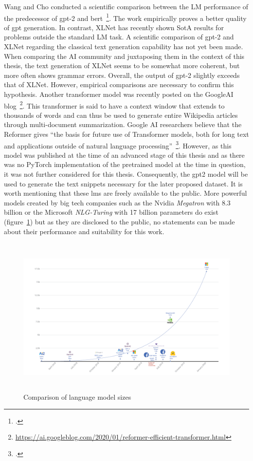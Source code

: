 Wang and Cho conducted a scientific comparison between the LM performance of the predecessor of \gls{gpt}-2 and \gls{bert}~\footcite{wang2019bert}. The work empirically proves a better quality of \gls{gpt} generation. In contrast, XLNet has recently shown SotA results for problems outside the standard LM task. A scientific comparison of \gls{gpt}-2 and XLNet regarding the classical text generation capability has not yet been made. When comparing the AI community and juxtaposing them in the context of this thesis, the text generation of XLNet seems to be somewhat more coherent, but more often shows grammar errors. Overall, the output of \gls{gpt}-2 slightly exceeds that of XLNet. However, empirical comparisons are necessary to confirm this hypothesis. Another transformer model was recently posted on the GoogleAI blog~\footnote{\url{https://ai.googleblog.com/2020/01/reformer-efficient-transformer.html}}. This transformer is said to have a context window that extends to thousands of words and can thus be used to generate entire Wikipedia articles through multi-document summarization. Google AI researchers believe that the Reformer gives ``the basis for future use of Transformer models, both for long text and applications outside of natural language processing''~\footcite{kitaev2020reformer}. However, as this model was published at the time of an advanced stage of this thesis and as there was no PyTorch implementation of the pretrained model at the time in question, it was not further considered for this thesis. Consequently, the \gls{gpt2} model will be used to generate the text snippets necessary for the later proposed dataset. It is worth mentioning that these \gls{lm}s are freely available to the public. More powerful models created by big tech companies such as the Nvidia \textit{Megatron} with 8.3 billion or the Microsoft \textit{NLG-Turing} with 17 billion parameters do exist (figure~\ref{fig:lm_model_comparison}) but as they are disclosed to the public, no statements can be made about their performance and suitability for this work.
\begin{figure}[h]
  	\includegraphics[height=8cm]{img/lm_model_comparison}
  	\caption{Comparison of language model sizes}
	\label{fig:lm_model_comparison}
\end{figure}
